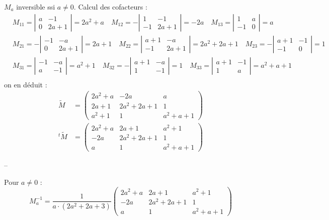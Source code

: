 {{$$$$
$M_a$ inversible ssi $a \neq 0$.
Calcul des cofacteurs :
$$
\begin{aligned}
	& M_{11}=\left|\begin{array}{cc}
		a & -1 \\
		0 & 2 a+1
	\end{array}\right|=2 a^2+a \quad M_{12}=-\left|\begin{array}{cc}
		1 & -1 \\
		-1 & 2 a+1
	\end{array}\right|=-2 a \quad M_{13}=\left|\begin{array}{cc}
		1 & a \\
		-1 & 0
	\end{array}\right|=a \\
	& M_{21}=-\left|\begin{array}{cc}
		-1 & -a \\
		0 & 2 a+1
	\end{array}\right|=2 a+1 \quad M_{22}=\left|\begin{array}{cc}
		a+1 & -a \\
		-1 & 2 a+1
	\end{array}\right|=2 a^2+2 a+1 \quad M_{23}=-\left|\begin{array}{cc}
		a+1 & -1 \\
		-1 & 0
	\end{array}\right|=1 \\
	& M_{31}=\left|\begin{array}{cc}
		-1 & -a \\
		a & -1
	\end{array}\right|=a^2+1 \quad M_{32}=-\left|\begin{array}{cc}
		a+1 & -a \\
		1 & -1
	\end{array}\right|=1 \quad M_{33}=\left|\begin{array}{cc}
		a+1 & -1 \\
		1 & a
	\end{array}\right|=a^2+a+1 \\
	&
\end{aligned}
$$
on en déduit :
$$
\begin{aligned}
	\tilde{M} & =\left(\begin{array}{ccc}
		2 a^2+a & -2 a & a \\
		2 a+1 & 2 a^2+2 a+1 & 1 \\
		a^2+1 & 1 & a^2+a+1
	\end{array}\right) \\
	{ }^t \tilde{M} & =\left(\begin{array}{ccc}
		2 a^2+a & 2 a+1 & a^2+1 \\
		-2 a & 2 a^2+2 a+1 & 1 \\
		a & 1 & a^2+a+1
	\end{array}\right)
\end{aligned}
$$

--

Pour $a \neq 0$ :
$$
M_a^{-1}=\frac{1}{a \cdot\left(2 a^2+2 a+3\right)}\left(\begin{array}{ccc}
	2 a^2+a & 2 a+1 & a^2+1 \\
	-2 a & 2 a^2+2 a+1 & 1 \\
	a & 1 & a^2+a+1
\end{array}\right)
$$ }}

